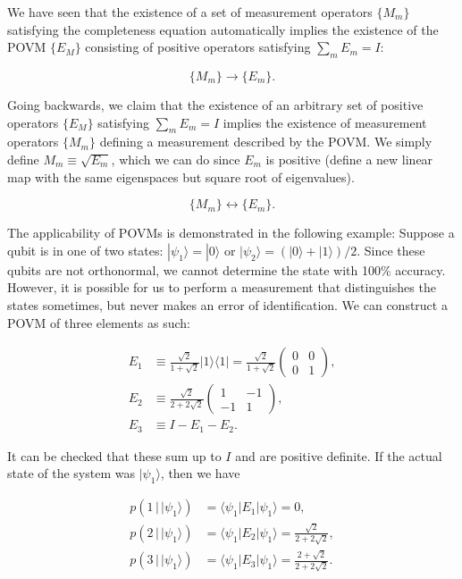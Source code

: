\documentclass{article}
\theoremstyle{definition}
\begin{document}
      We have seen that the existence of a set of measurement operators $\{M_m\}$ satisfying the completeness equation automatically implies the existence of the POVM $\{E_M\}$ consisting of positive operators satisfying $\sum_m E_m = I$:

        \[\{M_m\} \longrightarrow \{E_m\}.\]

      Going backwards, we claim that the existence of an arbitrary set of positive operators $\{E_M\}$ satisfying $\sum_m E_m = I$ implies the existence of measurement operators $\{M_m\}$ defining a measurement described by the POVM. We simply define $M_m \equiv \sqrt{E_m}$, which we can do since $E_m$ is positive (define a new linear map with the same eigenspaces but square root of eigenvalues).

        \[\{M_m\} \longleftrightarrow \{E_m\}.\]

      The applicability of POVMs is demonstrated in the following example: Suppose a qubit is in one of two states: $|\psi_1 \rangle = |0 \rangle$ or $|\psi_2 \rangle = (|0 \rangle + |1 \rangle)/2$. Since these qubits are not orthonormal, we cannot determine the state with 100\% accuracy. However, it is possible for us to perform a measurement that distinguishes the states sometimes, but never makes an error of identification. We can construct a POVM of three elements as such:

      \begin{align*}
        E_1 & \equiv \frac{\sqrt{2}}{1 + \sqrt{2}} |1\rangle \langle 1| = \frac{\sqrt{2}}{1 + \sqrt{2}} \begin{pmatrix} 0&0\\0&1 \end{pmatrix}, \\
        E_2 & \equiv \frac{\sqrt{2}}{2 + 2 \sqrt{2}} \begin{pmatrix} 1 & -1 \\ -1 & 1 \end{pmatrix}, \\
        E_3 & \equiv I - E_1 - E_2.
      \end{align*}

      It can be checked that these sum up to $I$ and are positive definite. If the actual state of the system was $|\psi_1 \rangle$, then we have

      \begin{align*}
        p(1 \,|\, |\psi_1 \rangle) & = \langle \psi_1 | E_1 | \psi_1 \rangle = 0, \\
        p(2 \,|\, |\psi_1 \rangle) & = \langle \psi_1 | E_2 | \psi_1 \rangle = \frac{\sqrt{2}}{2 + 2\sqrt{2}}, \\
        p(3 \,|\, |\psi_1 \rangle) & = \langle \psi_1 | E_3 | \psi_1 \rangle =  \frac{2 + \sqrt{2}}{2 + 2\sqrt{2}}.
      \end{align*}
\end{document}
